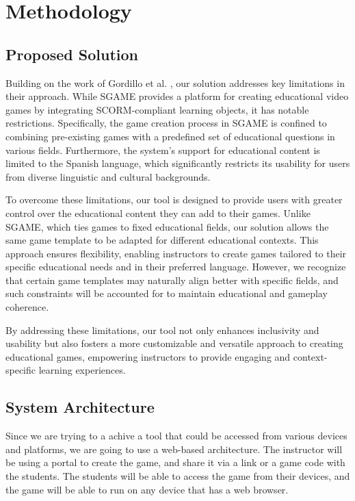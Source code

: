 \chapter{Methodology}\label{chap:method}

\section{Proposed Solution}

Building on the work of Gordillo et al. \cite{sgame2020}, our solution addresses key limitations in their approach. While SGAME provides a platform for creating educational video games by integrating SCORM-compliant learning objects, it has notable restrictions. Specifically, the game creation process in SGAME is confined to combining pre-existing games with a predefined set of educational questions in various fields. Furthermore, the system’s support for educational content is limited to the Spanish language, which significantly restricts its usability for users from diverse linguistic and cultural backgrounds.

To overcome these limitations, our tool is designed to provide users with greater control over the educational content they can add to their games. Unlike SGAME, which ties games to fixed educational fields, our solution allows the same game template to be adapted for different educational contexts. This approach ensures flexibility, enabling instructors to create games tailored to their specific educational needs and in their preferred language. However, we recognize that certain game templates may naturally align better with specific fields, and such constraints will be accounted for to maintain educational and gameplay coherence.

By addressing these limitations, our tool not only enhances inclusivity and usability but also fosters a more customizable and versatile approach to creating educational games, empowering instructors to provide engaging and context-specific learning experiences.

\section{System Architecture}
Since we are trying to a achive a tool that could be accessed from various devices and platforms, 
we are going to use a web-based architecture. The instructor will be using a portal to create the game, 
and share it via a link or a game code with the students. The students will be able to access the game from their devices, 
and the game will be able to run on any device that has a web browser.
